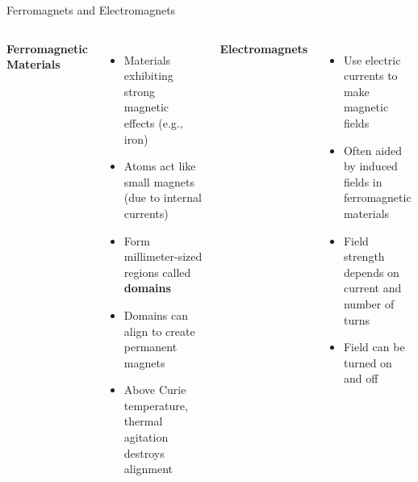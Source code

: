\documentclass{beamer}
\begin{document}
\begin{frame}{Ferromagnets and Electromagnets}
\begin{columns}
\textbf{Ferromagnetic Materials}
\begin{itemize}
\item Materials exhibiting strong magnetic effects (e.g., iron)
\item Atoms act like small magnets (due to internal currents)
\item Form millimeter-sized regions called \textbf{domains}
\item Domains can align to create permanent magnets
\item Above Curie temperature, thermal agitation destroys alignment
\end{itemize}

\textbf{Electromagnets}
\begin{itemize}
\item Use electric currents to make magnetic fields
\item Often aided by induced fields in ferromagnetic materials
\item Field strength depends on current and number of turns
\item Field can be turned on and off
\end{itemize}
\end{columns}

\end{frame}
\end{document}
